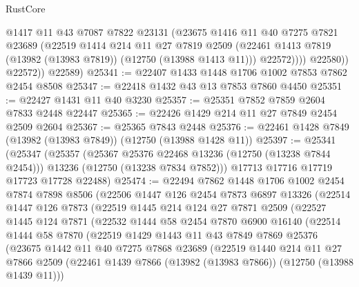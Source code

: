 \begin{lexlean}{RustCore}
\begin{coremodule}
                  @1417
                  @11
                  @43
                  @7087
                  @7822
                  @23131
                  (@23675
                    @1416
                    @11
                    @40
                    @7275
                    @7821
                    @23689
                    (@22519
                      @1414
                      @214
                      @11
                      @27
                      @7819
                      @2509
                      (@22461 @1413 @7819 (@13982 (@13983 @7819)) (@12750 (@13988 @1413 @11)))
                      @22572))))
              @22580))
          @22572))
      @22589)
@25341 := @22407 @1433 @1448 @1706 @1002 @7853 @7862 @2454 @8508
@25347 := @22418 @1432 @43 @13 @7853 @7860 @4450
@25351 := @22427 @1431 @11 @40 @3230
@25357 := @25351 @7852 @7859 @2604 @7833 @2448 @22447
@25365 := @22426 @1429 @214 @11 @27 @7849 @2454 @2509 @2604
@25367 := @25365 @7843 @2448
@25376 := @22461 @1428 @7849 (@13982 (@13983 @7849)) (@12750 (@13988 @1428 @11))
@25397 := @25341
    (@25347
      (@25357
        (@25367 @25376 @22468 @13236 (@12750 (@13238 @7844 @2454)))
        @13236
        (@12750 (@13238 @7834 @7852)))
      @17713
      @17716
      @17719
      @17723
      @17728
      @22488)
@25474 := @22494
    @7862
    @1448
    @1706
    @1002
    @2454
    @7874
    @7898
    @8506
    (@22506
      @1447
      @126
      @2454
      @7873
      @6897
      @13326
      (@22514
        @1447
        @126
        @7873
        (@22519
          @1445
          @214
          @124
          @27
          @7871
          @2509
          (@22527
            @1445
            @124
            @7871
            (@22532
              @1444
              @58
              @2454
              @7870
              @6900
              @16140
              (@22514
                @1444
                @58
                @7870
                (@22519
                  @1429
                  @1443
                  @11
                  @43
                  @7849
                  @7869
                  @25376
                  (@23675
                    @1442
                    @11
                    @40
                    @7275
                    @7868
                    @23689
                    (@22519
                      @1440
                      @214
                      @11
                      @27
                      @7866
                      @2509
                      (@22461 @1439 @7866 (@13982 (@13983 @7866)) (@12750 (@13988 @1439 @11)))

\end{coremodule}
\end{lexlean}
